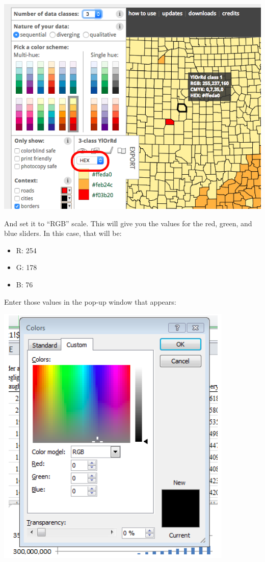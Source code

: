 \documentclass[
]{book}
\providecommand{\tightlist}{%
  \setlength{\itemsep}{0pt}\setlength{\parskip}{0pt}}
\begin{document}
\includegraphics{imgs/choose_col_code.png}

And set it to ``RGB'' scale. This will give you the values for the red, green, and blue sliders. In this case, that will be:

\begin{itemize}
\tightlist
\item
  R: 254
\item
  G: 178
\item
  B: 76
\end{itemize}

Enter those values in the pop-up window that appears:

\includegraphics{imgs/pc_rbg.png}
\end{document}
